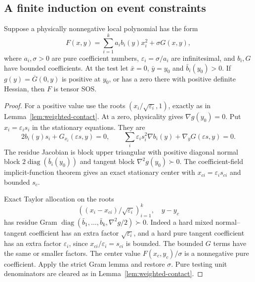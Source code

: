 \subsection{A finite induction on event constraints}
\begin{lemma}\label{lem:diagonal-hard-scales}
Suppose a physically nonnegative local polynomial has the form
\[
F(x,y)=\sum_{i=1}^k a_i b_i(y)x_i^2+\sigma G(x,y),
\]
where $a_i,\sigma>0$ are pure coefficient numbers,
$\varepsilon_i=\sigma/a_i$ are infinitesimal, and $b_i,G$ have bounded coefficients. At the test let $\bar x=0$, $\bar y=y_0$ and $\bar b_i(y_0)>0$. If $g(y)=\overline G(0,y)$ is positive at $y_0$, or has a zero there with positive definite Hessian, then $F$ is tensor SOS.
\end{lemma}
\begin{proof}
For a positive value use the roots $(x_i/\sqrt{\varepsilon_i},1)$, exactly as in Lemma~\ref{lem:weighted-contact}. At a zero, physicality gives $\nabla g(y_0)=0$. Put $x_i=\varepsilon_i s_i$ in the stationary equations. They are
\[
2b_i(y)s_i+G_{x_i}(\varepsilon s,y)=0,
\qquad
\sum_i\varepsilon_i s_i^2\nabla b_i(y)+\nabla_yG(\varepsilon s,y)=0.
\]
The residue Jacobian is block upper triangular with positive diagonal normal block $2\operatorname{diag}(\bar b_i(y_0))$ and tangent block $\nabla^2g(y_0)\succ0$. The coefficient-field implicit-function theorem gives an exact stationary center with $x_{ci}=\varepsilon_i s_{ci}$ and bounded $s_c$.

Exact Taylor allocation on the roots
\[
\left((x_i-x_{ci})/\sqrt{\varepsilon_i}\right)_{i=1}^k,
\quad y-y_c
\]
has residue Gram
$\operatorname{diag}(\bar b_1,\ldots,\bar b_k,\nabla^2g/2)\succ0$.
Indeed a hard mixed normal--tangent coefficient has an extra factor $\sqrt{\varepsilon_i}$, and a hard pure tangent coefficient has an extra factor $\varepsilon_i$, since $x_{ci}/\varepsilon_i=s_{ci}$ is bounded. The bounded $G$ terms have the same or smaller factors. The center value $F(x_c,y_c)/\sigma$ is a nonnegative pure coefficient. Apply the strict Gram lemma and restore $\sigma$. Pure testing unit denominators are cleared as in Lemma~\ref{lem:weighted-contact}.
\end{proof}

